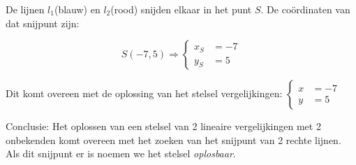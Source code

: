 De lijnen $l_1$(blauw) en $l_2$(rood) snijden elkaar in het punt $S$. De co\"ordinaten van dat snijpunt zijn:

\[
S(-7,5)\Rightarrow
\begin{cases}
    x_S&=-7 \\
    y_S&=5
\end{cases}
\]

Dit komt overeen met de oplossing van het stelsel vergelijkingen: $\begin{cases}
    x&=-7 \\
    y&=5
\end{cases}$

Conclusie:
Het oplossen van een stelsel van 2 lineaire vergelijkingen met 2 onbekenden komt overeen met het zoeken van het snijpunt van 2 rechte lijnen. Als dit snijpunt er is noemen we het stelsel \emph{oplosbaar}.

